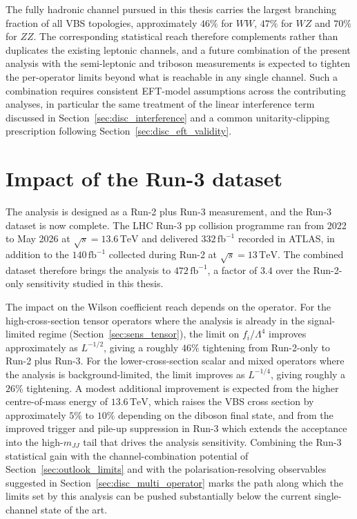 The fully hadronic channel pursued in this thesis carries the largest branching fraction of all VBS topologies, approximately $46\%$ for $WW$, $47\%$ for $WZ$ and $70\%$ for $ZZ$. The corresponding statistical reach therefore complements rather than duplicates the existing leptonic channels, and a future combination of the present analysis with the semi-leptonic and triboson measurements is expected to tighten the per-operator limits beyond what is reachable in any single channel. Such a combination requires consistent EFT-model assumptions across the contributing analyses, in particular the same treatment of the linear interference term discussed in Section~\ref{sec:disc_interference} and a common unitarity-clipping prescription following Section~\ref{sec:disc_eft_validity}.

\section{Impact of the Run-3 dataset}
\label{sec:outlook_run3}

The analysis is designed as a Run-2 plus Run-3 measurement, and the Run-3 dataset is now complete. The LHC Run-3 pp collision programme ran from 2022 to May 2026 at $\sqrt{s}=13.6\,\mathrm{TeV}$ and delivered $332\,\mathrm{fb}^{-1}$ recorded in ATLAS, in addition to the $140\,\mathrm{fb}^{-1}$ collected during Run-2 at $\sqrt{s}=13\,\mathrm{TeV}$. The combined dataset therefore brings the analysis to $472\,\mathrm{fb}^{-1}$, a factor of $3.4$ over the Run-2-only sensitivity studied in this thesis.

The impact on the Wilson coefficient reach depends on the operator. For the high-cross-section tensor operators where the analysis is already in the signal-limited regime (Section~\ref{sec:sens_tensor}), the limit on $f_i/\Lambda^4$ improves approximately as $L^{-1/2}$, giving a roughly $46\%$ tightening from Run-2-only to Run-2 plus Run-3. For the lower-cross-section scalar and mixed operators where the analysis is background-limited, the limit improves as $L^{-1/4}$, giving roughly a $26\%$ tightening. A modest additional improvement is expected from the higher centre-of-mass energy of $13.6\,\mathrm{TeV}$, which raises the VBS cross section by approximately $5\%$ to $10\%$ depending on the diboson final state, and from the improved trigger and pile-up suppression in Run-3 which extends the acceptance into the high-$m_{JJ}$ tail that drives the analysis sensitivity. Combining the Run-3 statistical gain with the channel-combination potential of Section~\ref{sec:outlook_limits} and with the polarisation-resolving observables suggested in Section~\ref{sec:disc_multi_operator} marks the path along which the limits set by this analysis can be pushed substantially below the current single-channel state of the art.
